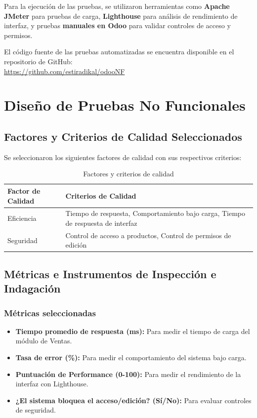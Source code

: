 \documentclass[12pt, letterpaper]{article}
\begin{document}
Para la ejecución de las pruebas, se utilizaron herramientas como \textbf{Apache JMeter} para pruebas de carga, \textbf{Lighthouse} para análisis de rendimiento de interfaz, y pruebas \textbf{manuales en Odoo} para validar controles de acceso y permisos.

El código fuente de las pruebas automatizadas se encuentra disponible en el repositorio de GitHub: \\
\url{https://github.com/estiradikal/odooNF}

\newpage

\section{Diseño de Pruebas No Funcionales}

\subsection{Factores y Criterios de Calidad Seleccionados}

Se seleccionaron los siguientes factores de calidad con sus respectivos criterios:

\begin{table}[H]
\centering
\caption{Factores y criterios de calidad}
\begin{tabular}{|p{4cm}|p{8cm}|}
\hline
\textbf{Factor de Calidad} & \textbf{Criterios de Calidad} \\
\hline
Eficiencia & Tiempo de respuesta, Comportamiento bajo carga, Tiempo de respuesta de interfaz \\
\hline
Seguridad & Control de acceso a productos, Control de permisos de edición \\
\hline
\end{tabular}
\end{table}

\subsection{Métricas e Instrumentos de Inspección e Indagación}

\subsubsection{Métricas seleccionadas}
\begin{itemize}
    \item \textbf{Tiempo promedio de respuesta (ms):} Para medir el tiempo de carga del módulo de Ventas.
    \item \textbf{Tasa de error (\%):} Para medir el comportamiento del sistema bajo carga.
    \item \textbf{Puntuación de Performance (0-100):} Para medir el rendimiento de la interfaz con Lighthouse.
    \item \textbf{¿El sistema bloquea el acceso/edición? (Sí/No):} Para evaluar controles de seguridad.
\end{itemize}
\end{document}
